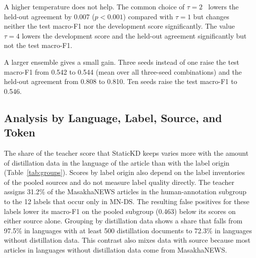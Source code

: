 \documentclass{ieeeaccess}
\begin{document}
A higher temperature does not help. The common choice of $\tau=2$~\cite{hinton2015distilling} lowers the held-out agreement by 0.007 ($p<0.001$) compared with $\tau=1$ but changes neither the test macro-F1 nor the development score significantly. The value $\tau=4$ lowers the development score and the held-out agreement significantly but not the test macro-F1.

A larger ensemble gives a small gain. Three seeds instead of one raise the test macro-F1 from 0.542 to 0.544 (mean over all three-seed combinations) and the held-out agreement from 0.808 to 0.810. Ten seeds raise the test macro-F1 to 0.546.

\subsection{Analysis by Language, Label, Source, and Token}
\label{sec:res-lang}
The share of the teacher score that StaticKD keeps varies more with the amount of distillation data in the language of the article than with the label origin (Table~\ref{tab:groups}). Scores by label origin also depend on the label inventories of the pooled sources and do not measure label quality directly. The teacher assigns 31.2\% of the MasakhaNEWS articles in the human-annotation subgroup to the 12 labels that occur only in MN-DS. The resulting false positives for these labels lower its macro-F1 on the pooled subgroup (0.463) below its scores on either source alone. Grouping by distillation data shows a share that falls from 97.5\% in languages with at least 500 distillation documents to 72.3\% in languages without distillation data. This contrast also mixes data with source because most articles in languages without distillation data come from MasakhaNEWS.
\end{document}
